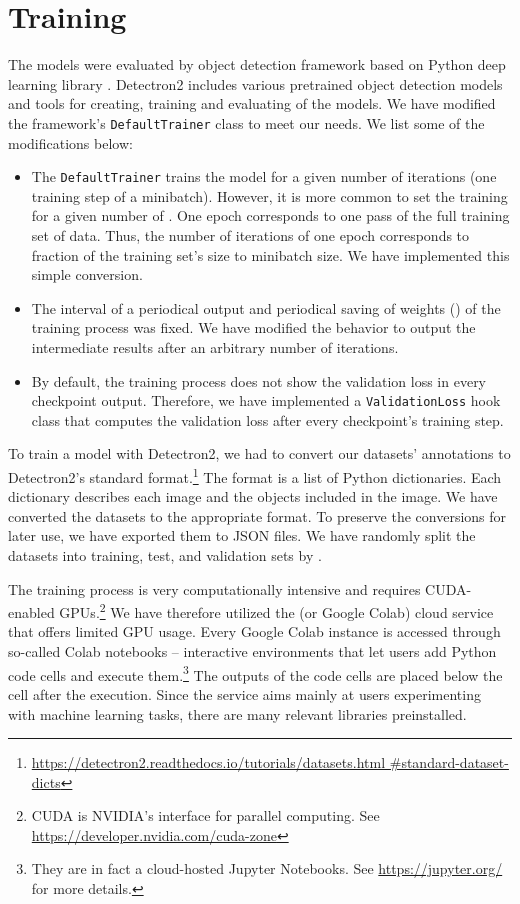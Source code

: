 \section{Training}
The models were evaluated by  object detection framework
\cite{detectron} based on Python deep learning library 
\cite{pytorch}. Detectron2 includes various pretrained object detection
models and tools for creating, training and evaluating of the models. We have
modified the framework's \texttt{DefaultTrainer} class to meet our needs. We
list some of the modifications below:
\begin{itemize}
	\item The \texttt{DefaultTrainer} trains the model for a given number of
	      iterations (one training step of a minibatch). However, it is more
	      common to set the training for a given number of . One
	      epoch corresponds to one pass of the full training set of data. Thus,
	      the number of iterations of one epoch corresponds to fraction of the
	      training set's size to minibatch size. We have implemented this
	      simple conversion.
	\item The interval of a periodical output and periodical saving of weights
	      () of the training process was fixed. We have modified
	      the behavior to output the intermediate results after an arbitrary
	      number of iterations.
	\item By default, the training process does not show the validation loss in
	      every checkpoint output. Therefore, we have implemented a
	      \texttt{ValidationLoss} hook class that computes the validation loss
	      after every checkpoint's training step.
\end{itemize}
To train a model with Detectron2, we had to convert our datasets' annotations to
Detectron2's standard format.\footnote{
	\url{https://detectron2.readthedocs.io/tutorials/datasets.html
		\#standard-dataset-dicts}
}
The format is a list of Python dictionaries. Each dictionary describes each
image and the objects included in the image. We have converted the datasets to
the appropriate format. To preserve the conversions for later use, we have
exported them to JSON files. We have randomly split the datasets into
training, test, and validation sets by .

The training process is very computationally intensive and requires CUDA-enabled
GPUs.\footnote{CUDA is NVIDIA's interface for parallel computing. See
	\url{https://developer.nvidia.com/cuda-zone}} We have therefore utilized the
 (or Google
Colab) cloud service that offers limited GPU usage. Every Google Colab instance
is accessed through so-called Colab notebooks -- interactive environments that
let users add Python code cells and execute them.\footnote{
	They are in fact a cloud-hosted Jupyter Notebooks. See
	\url{https://jupyter.org/} for more details.
} The outputs of the code cells are placed below the cell after the execution.
Since the service aims mainly at users experimenting with machine learning
tasks, there are many relevant libraries preinstalled.

